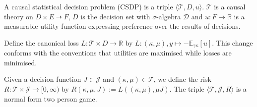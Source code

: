 \begin{definition}\label{def:CSDP}
A causal statistical decision problem (CSDP) is a triple $\langle \mathscr{T}, D, u \rangle$. $\mathscr{T}$ is a causal theory on $D\times E\rightarrowtriangle F$, $D$ is the decision set with $\sigma$-algebra $\mathcal{D}$ and $u:F\to \mathbb{R}$ is a measurable utility function expressing preference over the results of decisions.

Define the canonical loss $L:\mathscr{T}\times D\to \mathbb{R}$ by $L:(\kappa,\mu),y\mapsto -\mathbb{E}_{\gamma\kappa}[u]$. This change conforms with the conventions that utilities are maximised while losses are minimised.

Given a decision function $J\in\mathscr{J}$ and $(\kappa,\mu)\in \mathscr{T}$, we define the risk $R:\mathscr{T}\times \mathscr{J} \to [0,\infty)$ by $R(\kappa,\mu,J) := L((\kappa,\mu),\mu J)$. The triple $\langle \mathscr{T}, \mathscr{J}, R\rangle$ is a normal form two person game.
\end{definition}

